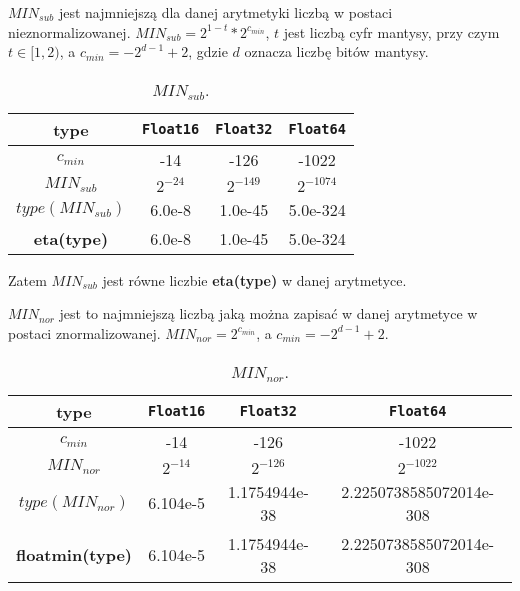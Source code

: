 \documentclass{article}
\begin{document}
\begin{center}
    \large \(MIN_{sub}\) jest najmniejszą dla danej arytmetyki liczbą w postaci nieznormalizowanej. \newline
    \(\displaystyle MIN_{sub} = 2^{1-t}*2^{c_{min}}\),
    \(t\) jest liczbą cyfr mantysy, przy czym \(t \in [1,2)\), \newline a \(c_{min} = -2^{d-1} + 2\), gdzie \(d\) oznacza liczbę bitów mantysy.
    \begin{table}[h!]
    \centering
    \begin{tabular}{||c c c c||} 
    \hline
    \textbf{type} & \texttt{Float16} & \texttt{Float32} & \texttt{Float64} \\ [0.5ex]
    \hline\hline
    \textbf{\(c_{min}\)} & -14 & -126 & -1022  \\ 
    \textbf{\(MIN_{sub}\)} & \(2^{-24}\) & \(2^{-149}\) & \(2^{-1074}\) \\
    \textbf{\(type(MIN_{sub})\)} & 6.0e-8 & 1.0e-45 & 5.0e-324 \\
    \textbf{eta(type)} & 6.0e-8 & 1.0e-45 & 5.0e-324 \\
    \hline
    \end{tabular}
    \caption{\(MIN_{sub}\).}
    \label{table:4}
    \end{table}
    
    \large Zatem \(MIN_{sub}\) jest równe liczbie \textbf{eta(type)} w danej arytmetyce. \newline

    \(MIN_{nor}\) jest to najmniejszą liczbą jaką można zapisać w danej arytmetyce w postaci znormalizowanej. \newline
    \(MIN_{nor} = 2^{c_{min}}\), a \(c_{min} = -2^{d-1} + 2\).
    \begin{table}[h!]
    \centering
    \begin{tabular}{||c c c c||} 
    \hline
    \textbf{type} & \texttt{Float16} & \texttt{Float32} & \texttt{Float64} \\ [0.5ex]
    \hline\hline
    \textbf{\(c_{min}\)} & -14 & -126 & -1022  \\ 
    \textbf{\(MIN_{nor}\)} & \(2^{-14}\) & \(2^{-126}\) & \(2^{-1022}\) \\
    \textbf{\(type(MIN_{nor})\)} & 6.104e-5 & 1.1754944e-38 & 2.2250738585072014e-308 \\
    \textbf{floatmin(type)} & 6.104e-5 & 1.1754944e-38 & 2.2250738585072014e-308 \\
    \hline
    \end{tabular}
    \caption{\(MIN_{nor}\).}
    \label{table:5}
    \end{table}


\end{center}
\end{document}

